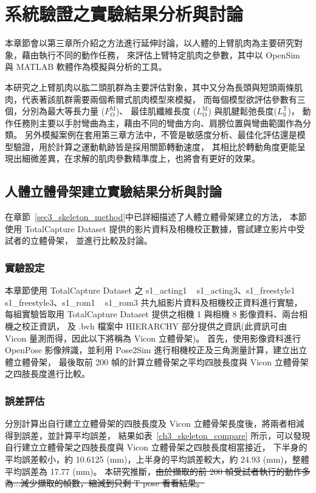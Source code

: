 \chapter{系統驗證之實驗結果分析與討論}
\fontsize{12pt}{18pt}\selectfont %

本章節會以第三章所介紹之方法進行延伸討論，以人體的上臂肌肉為主要研究對象，藉由執行不同的動作任務，
來評估上臂特定肌肉之參數，其中以 OpenSim 與 MATLAB 軟體作為模擬與分析的工具。

本研究之上臂肌肉以肱二頭肌群為主要評估對象，其中又分為長頭與短頭兩條肌肉，代表著該肌群需要兩個希爾式肌肉模型來模擬，
而每個模型欲評估參數有三個，分別為最大等長力量 ($F^\mathrm{M}_\mathrm{O}$)、
最佳肌纖維長度 ($L^\mathrm{M}_\mathrm{O}$) 與肌腱鬆弛長度($L^\mathrm{T}_\mathrm{S}$)，
動作任務則主要以手肘彎曲為主，藉由不同的彎曲方向、肩膀位置與彎曲範圍作為分類。
另外模擬案例在套用第三章方法中，不管是敏感度分析、最佳化評估還是模型驗證，用於計算之運動軌跡皆是採用關節轉動速度，
其相比於轉動角度更能呈現出細微差異，在求解的肌肉參數精準度上，也將會有更好的效果。

\section{人體立體骨架建立實驗結果分析與討論}\label{sec4_skeleton_exp}
在章節~\ref{sec3_skeleton_method}中已詳細描述了人體立體骨架建立的方法，
本節使用 TotalCapture Dataset 提供的影片資料及相機校正數據，嘗試建立影片中受試者的立體骨架，
並進行比較及討論。

\subsection{實驗設定}
本章節使用 TotalCapture Dataset 之 s1\_acting1 ~ s1\_acting3、s1\_freestyle1 ~ s1\_freestyle3、s1\_rom1 ~ s1\_rom3 共九組影片資料及相機校正資料進行實驗，
每組實驗皆取用 TotalCapture Dataset 提供之相機 1 與相機 8 影像資料、兩台相機之校正資訊，
及 .bvh 檔案中 HIERARCHY 部分提供之資訊(此資訊可由 Vicon 量測而得，因此以下將稱為 Vicon 立體骨架)。
首先，使用影像資料進行 OpenPose 影像辨識，並利用 Pose2Sim 進行相機校正及三角測量計算，建立出立體立體骨架，
最後取前 200 幀的計算立體骨架之平均四肢長度與 Vicon 立體骨架之四肢長度進行比較。

\subsection{誤差評估}
分別計算出自行建立立體骨架的四肢長度及 Vicon 立體骨架長度後，將兩者相減得到誤差，並計算平均誤差，
結果如表~\ref{ch3_skeleton_compare} 所示，可以發現自行建立立體骨架之四肢長度與 Vicon 立體骨架之四肢長度相當接近，
下半身的平均誤差較小，約 10.6125 (mm)，上半身的平均誤差較大，約 24.93 (mm)，整體平均誤差為 17.77 (mm)。
本研究推斷，\sout{由於擷取的前 200 幀受試者執行的動作多為...減少擷取的幀數，縮減到只剩 T pose 看看結果。}

